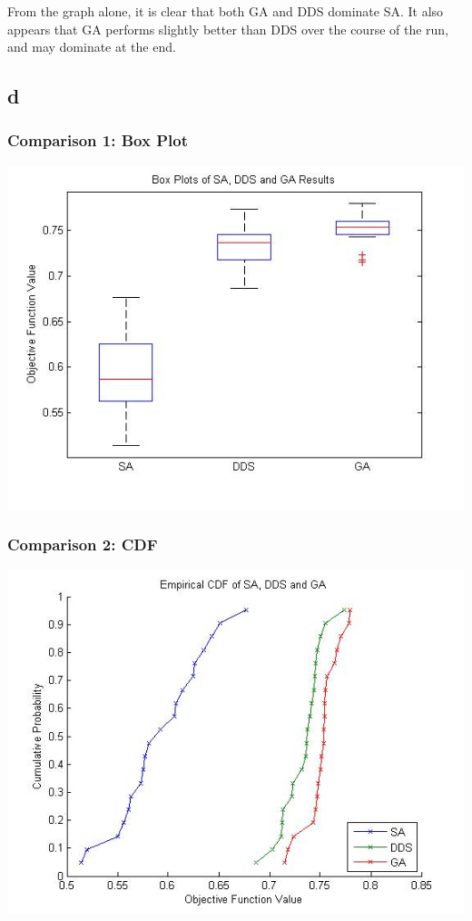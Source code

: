 \documentclass[12pt]{article}
\begin{document}
From the graph alone, it is clear that both GA and DDS dominate SA. It also appears that GA performs slightly better than DDS over the course of the run, and may dominate at the end.

\subsection{d}

\subsubsection{Comparison 1: Box Plot}
\includegraphics[scale=0.6]{boxplot}\\
\subsubsection{Comparison 2: CDF}
\includegraphics[scale=0.6]{cdf}\\
\end{document}
